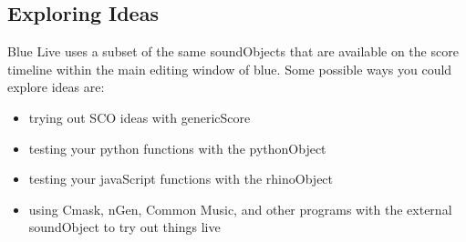 \subsection{Exploring Ideas}

Blue Live uses a subset of the same soundObjects that are available on
the score timeline within the main editing window of blue. Some possible
ways you could explore ideas are:

\begin{itemize}
\item
  trying out SCO ideas with genericScore
\item
  testing your python functions with the pythonObject
\item
  testing your javaScript functions with the rhinoObject
\item
  using Cmask, nGen, Common Music, and other programs with the external
  soundObject to try out things live
\end{itemize}
